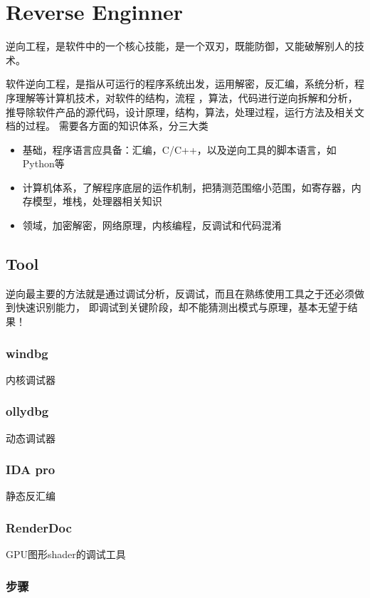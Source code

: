 \clearpage
\chapter{Reverse Enginner}
逆向工程，是软件中的一个核心技能，是一个双刃，既能防御，又能破解别人的技术。

软件逆向工程，是指从可运行的程序系统出发，运用解密，反汇编，系统分析，程序理解等计算机技术，对软件的结构，流程
，算法，代码进行逆向拆解和分析，推导除软件产品的源代码，设计原理，结构，算法，处理过程，运行方法及相关文档的过程。
需要各方面的知识体系，分三大类
\begin{itemize}
    \item {基础，程序语言应具备：汇编，C/C++，以及逆向工具的脚本语言，如Python等}
    \item {计算机体系，了解程序底层的运作机制，把猜测范围缩小范围，如寄存器，内存模型，堆栈，处理器相关知识}
    \item {领域，加密解密，网络原理，内核编程，反调试和代码混淆}
\end{itemize}

\section{Tool}

逆向最主要的方法就是通过调试分析，反调试，而且在熟练使用工具之于还必须做到快速识别能力，
即调试到关键阶段，却不能猜测出模式与原理，基本无望于结果！

\subsection{windbg}
内核调试器

\subsection{ollydbg}
动态调试器

\subsection{IDA pro}
静态反汇编

\subsection{RenderDoc}
GPU图形shader的调试工具


\subsection{步骤}

